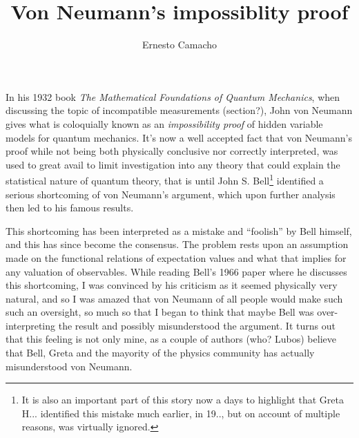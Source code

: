 \documentclass[a4paper]{article}
\title{Von Neumann's impossiblity proof}
\author{Ernesto Camacho}
\theoremstyle{definition}
\theoremstyle{plain}
\begin{document}
    \maketitle


    In his 1932 book \textit{The Mathematical Foundations of
    Quantum Mechanics}, when discussing the topic of
    incompatible measurements (section?), John von Neumann
    gives what is coloquially known as an
    \textit{impossibility proof} of hidden variable models
    for quantum mechanics.  It's now a well accepted fact
    that von Neumann's proof while not being both physically
    conclusive nor correctly interpreted, was used to great
    avail to limit investigation into any theory that could
    explain the statistical nature of quantum theory, that
    is until John S. Bell\footnote{It is also an important
        part of this story now a days to highlight that
        Greta H... identified this mistake much earlier, in
        19.., but on account of multiple reasons, was
    virtually ignored.} identified a serious shortcoming of von
    Neumann's argument, which upon further analysis then led
    to his famous results.

    This shortcoming has been interpreted as a mistake and
    ``foolish'' by Bell himself, and this has since become
    the consensus. The problem rests upon an assumption made
    on the functional relations of expectation values and
    what that implies for any valuation of observables.
    While reading Bell's 1966 paper where he discusses this
    shortcoming, I was convinced by his criticism as it
    seemed physically very natural, and so I was amazed that
    von Neumann of all people would make such such an
    oversight, so much so that I began to think that maybe
    Bell was over-interpreting the result and possibly
    misunderstood the argument. It turns out that this
    feeling is not only mine, as a couple of authors (who?
    Lubos)  believe that Bell, Greta and the mayority of the
    physics community has actually misunderstood von
    Neumann.

\end{document}
